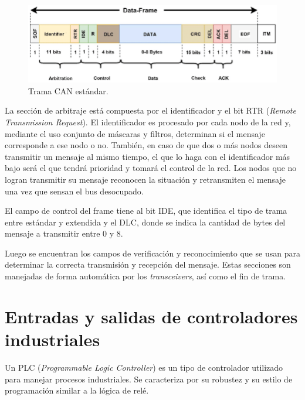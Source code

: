 \begin{figure}[h!]
	\centering
	\includegraphics[width=1\linewidth ,height=0.2\textheight]{./Figures/CANBUS-frame.png}
	\caption{Trama CAN estándar\protect\footnotemark .}
	\label{fig:trama_can}
\end{figure}


La sección de arbitraje está compuesta por el identificador y el bit RTR (\textit{Remote Transmission Request}). El identificador es procesado por cada nodo de la red y, mediante el uso conjunto de máscaras y filtros, determinan si el mensaje corresponde a ese nodo o no. También, en caso de que dos o más nodos deseen transmitir un mensaje al mismo tiempo, el que lo haga con el identificador más bajo será el que tendrá prioridad y tomará el control de la red. Los nodos que no logran transmitir su mensaje reconocen la situación y retransmiten el mensaje una vez que sensan el bus desocupado.

El campo de control del frame tiene al bit IDE, que identifica el tipo de trama entre estándar y extendida y el DLC, donde se indica la cantidad de bytes del mensaje a transmitir entre 0 y 8.

Luego se encuentran los campos de verificación y reconocimiento que se usan para determinar la correcta transmisión y recepción del mensaje. Estas secciones son manejadas de forma automática por los \textit{transceivers}, así como el fin de trama.

\section{Entradas y salidas de controladores industriales}
\label{io_industriales}

Un PLC (\textit{Programmable Logic Controller}) es un tipo de controlador utilizado para manejar procesos industriales. Se caracteriza por su robustez y su estilo de programación similar a la lógica de relé.

